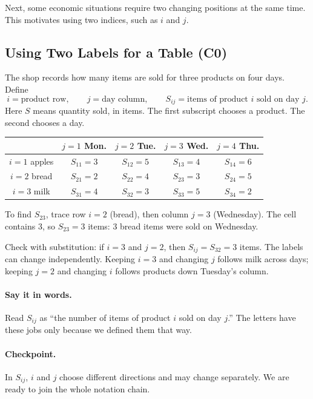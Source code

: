 	Next, some economic situations require two changing positions at the same time. This motivates using two indices, such as $i$ and $j$.
	
	
	\subsection{Using Two Labels for a Table (C0)}
	\label{sec:two-labels-c0}
	
	The shop records how many items are sold for three products on four days. Define
	\[
	i=\text{product row},\qquad j=\text{day column},\qquad
	S_{ij}=\text{items of product }i\text{ sold on day }j.
	\]
	Here $S$ means quantity sold, in items. The first subscript chooses a product. The second chooses a day.
	\begin{center}
		\begin{tabular}{c|cccc}
			& $j=1$ Mon. & $j=2$ Tue. & $j=3$ Wed. & $j=4$ Thu. \\
			\hline
			$i=1$ apples & $S_{11}=3$ & $S_{12}=5$ & $S_{13}=4$ & $S_{14}=6$ \\
			$i=2$ bread  & $S_{21}=2$ & $S_{22}=4$ & $S_{23}=3$ & $S_{24}=5$ \\
			$i=3$ milk   & $S_{31}=4$ & $S_{32}=3$ & $S_{33}=5$ & $S_{34}=2$
		\end{tabular}
	\end{center}
	To find $S_{23}$, trace row $i=2$ (bread), then column $j=3$ (Wednesday). The cell contains 3, so $S_{23}=3$ items: 3 bread items were sold on Wednesday.
	
	Check with substitution: if $i=3$ and $j=2$, then $S_{ij}=S_{32}=3$ items. The labels can change independently. Keeping $i=3$ and changing $j$ follows milk across days; keeping $j=2$ and changing $i$ follows products down Tuesday's column.
	
	\paragraph{Say it in words.}
	Read $S_{ij}$ as ``the number of items of product $i$ sold on day $j$.'' The letters have these jobs only because we defined them that way.
	
	\paragraph{Checkpoint.}
	In $S_{ij}$, $i$ and $j$ choose different directions and may change separately. We are ready to join the whole notation chain.
	

